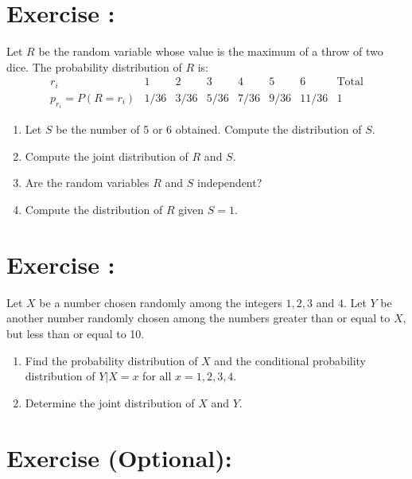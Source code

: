 \documentclass[12pt,thmsa]{article}
\begin{document}
\addtocounter{section}{1}
\section*{Exercise \thesection:}


Let $R$ be the random variable whose value is the maximum of a throw of two dice. The probability distribution
of $R$ is:
$$
\begin{array}{c|cccccc|c}
r_i & 1 & 2 & 3 & 4 & 5 & 6 & \text{Total} \\
\hline
p_{r_i}  = P( R=r_i) & 1/36 & 3/36& 5/36& 7/36& 9/36& 11/36& 1
\end{array}
$$
\begin{enumerate}%
\item Let $S$ be the number of 5 or 6 obtained. Compute the distribution of $S$.
\item Compute the joint distribution of $R$ and $S$.
\item Are the random variables $R$ and $S$ independent?
\item Compute the distribution of $R$ given $S=1$.
\end{enumerate}




\addtocounter{section}{1}
\section*{Exercise \thesection:}

Let $X$ be a number chosen randomly among the integers $1,2,3$ and $4$.
Let $Y$ be another number randomly chosen among the numbers greater than or equal to $X$, but less than or equal to 10.
\begin{enumerate}
  \item Find the probability distribution of $X$ and the conditional probability distribution of
 $Y\vert X=x$ for all $x=1,2,3,4$.
  \item Determine the joint distribution of $X$ and $Y$.
\end{enumerate}


\addtocounter{section}{1}
\section*{Exercise \thesection (Optional):}
\end{document}
